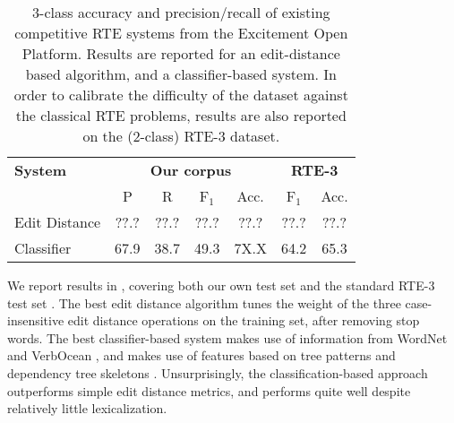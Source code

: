 %
%
\def\t#1{\small{#1}}
\def\b#1{\t{\textbf{#1}}}
\def\colspaceS{2.0mm}
\def\colspaceM{3.0mm}
\def\colspaceL{4.0mm}

\begin{table}
\begin{center}
\begin{tabular}{l@{\hskip \colspaceL}c@{\hskip \colspaceS}c@{\hskip \colspaceS}c@{\hskip \colspaceS}c@{\hskip \colspaceL}c@{\hskip \colspaceS}c}
\hline
\textbf{System} & \multicolumn{4}{c}{\b{Our corpus}} & \multicolumn{2}{c}{\b{RTE-3}} \\
 & \t{P} & \t{R} & \t{F$_1$} & \t{Acc.} & \t{F$_1$} & \t{Acc.} \\
\hline
\t{Edit Distance} & \t{??.?} & \t{??.?} & \t{??.?} & \t{??.?} & 
                    \t{??.?} & \t{??.?} \\
\t{Classifier}    & \t{67.9} & \t{38.7} & \t{49.3} & \t{7X.X} & 
                    \t{64.2} & \t{65.3} \\
\hline
\end{tabular}
\end{center}
\caption{
\label{tab:eopresults}
3-class accuracy and precision/recall of existing competitive RTE
systems from the Excitement Open Platform.
Results are reported for an edit-distance based algorithm, and a
  classifier-based system.
In order to calibrate the difficulty of the dataset against the 
  classical RTE problems, results are also reported on the (2-class) 
  RTE-3 dataset.
}
\end{table}
%
%

We report results in , covering both our own test set 
and the standard RTE-3 test set \cite{giampiccolo2007third}.
The best edit distance algorithm tunes the weight of the three 
  case-insensitive edit distance operations on the training set, 
  after removing stop words.
The best classifier-based system makes use of information from
  WordNet \cite{miller1995wordnet} and VerbOcean
  \cite{chklovski2004verbocean}, and makes use of features
  based on tree patterns and dependency tree skeletons
  \cite{wang2007recognizing}.
Unsurprisingly, the classification-based approach outperforms simple
  edit distance metrics, and performs quite well despite relatively
  little lexicalization.

%
%
